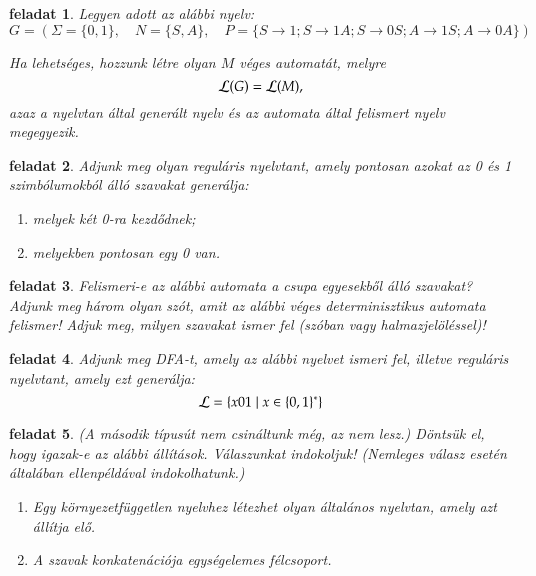 \documentclass[a4paper]{article}
\newtheorem{feladat}{feladat}[section]
\begin{document}
\begin{feladat}
Legyen adott az alábbi nyelv:
\[G = (\Sigma=\{0, 1\},\quad N=\{S, A\},\quad P=\{S\rightarrow 1; S\rightarrow
1A; S\rightarrow 0S; A\rightarrow 1S; A\rightarrow 0A\})\]

Ha lehetséges, hozzunk létre olyan $M$ véges automatát, melyre
\[{\cal L}(G) = {\cal L}(M),\]
azaz a nyelvtan által generált nyelv és az automata által felismert
nyelv megegyezik.
\end{feladat}

\begin{feladat}
Adjunk meg olyan reguláris nyelvtant, amely pontosan azokat az 0
és 1 szimbólumokból álló szavakat generálja:
  \begin{enumerate}
    \item melyek két 0-ra kezdődnek;
    \item melyekben pontosan egy 0 van.
  \end{enumerate}
\end{feladat}

\begin{feladat}
Felismeri-e az alábbi automata a csupa egyesekből álló szavakat? Adjunk
meg három olyan szót, amit az alábbi véges determinisztikus automata
felismer! Adjuk meg, milyen szavakat ismer fel (szóban vagy
halmazjelöléssel)!\\
\end{feladat}

\begin{feladat}
Adjunk meg DFA-t, amely az alábbi nyelvet ismeri fel, illetve
reguláris nyelvtant, amely ezt generálja: \[{\cal L}=\{x01 \mid x\in
\{0,1\}^*\}\]
\end{feladat}

\begin{feladat}
(A második típusút nem csináltunk még, az nem lesz.)
Döntsük el, hogy igazak-e az alábbi állítások. Válaszunkat
indokoljuk! (Nemleges válasz esetén általában ellenpéldával
indokolhatunk.)
  \begin{enumerate}
    \item Egy környezetfüggetlen nyelvhez létezhet olyan általános
	nyelvtan, amely azt állítja elő.
    \item A szavak konkatenációja egységelemes félcsoport.
  \end{enumerate}
\end{feladat}
\end{document}
